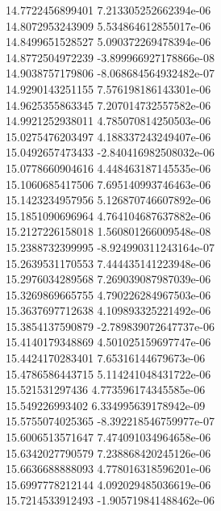 {14.7722456899401 7.213305252662394e-06 \\
14.8072953243909 5.534864612855017e-06 \\
14.8499651528527 5.090372269478394e-06 \\
14.8772504972239 -3.899966927178866e-08 \\
14.9038757179806 -8.068684564932482e-07 \\
14.9290143251155 7.576198186143301e-06 \\
14.9625355863345 7.207014732557582e-06 \\
14.9921252938011 4.785070814250503e-06 \\
15.0275476203497 4.188337243249407e-06 \\
15.0492657473433 -2.840416982508032e-06 \\
15.0778660904616 4.448463187145535e-06 \\
15.1060685417506 7.695140993746463e-06 \\
15.1423234957956 5.126870746607892e-06 \\
15.1851090696964 4.764104687637882e-06 \\
15.2127226158018 1.560801266009548e-08 \\
15.2388732399995 -8.924990311243164e-07 \\
15.2639531170553 7.444435141223948e-06 \\
15.2976034289568 7.269039087987039e-06 \\
15.3269869665755 4.790226284967503e-06 \\
15.3637697712638 4.109893325221492e-06 \\
15.3854137590879 -2.789839072647737e-06 \\
15.4140179348869 4.501025159697747e-06 \\
15.4424170283401 7.65316144679673e-06 \\
15.4786586443715 5.114241048431722e-06 \\
15.521531297436 4.773596174345585e-06 \\
15.549226993402 6.334995639178942e-09 \\
15.5755074025365 -8.392218546759977e-07 \\
15.6006513571647 7.474091034964658e-06 \\
15.6342027790579 7.238868420245126e-06 \\
15.6636688888093 4.778016318596201e-06 \\
15.6997778212144 4.092029485036619e-06 \\
15.7214533912493 -1.905719841488462e-06 \\
}
